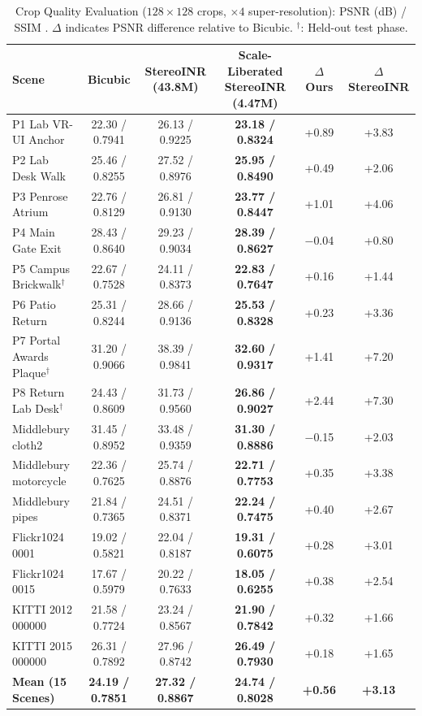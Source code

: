 \documentclass[conference]{IEEEtran}
\newcommand{\ours}{Scale-Liberated StereoINR}
\begin{document}
\begin{table}[!t]
\centering
\caption{Crop Quality Evaluation ($128{\times}128$ crops, $\times 4$ super-resolution): PSNR (dB) / SSIM \cite{ssim}. $\Delta$ indicates PSNR difference relative to Bicubic. $^\dagger$: Held-out test phase.}\label{tab:crop}
\small
\begin{tabular}{@{}lccccc@{}}
\toprule
\textbf{Scene} & \textbf{Bicubic} & \textbf{StereoINR (43.8M)} & \textbf{\ours{} (4.47M)} & \textbf{$\Delta$ Ours} & \textbf{$\Delta$ StereoINR} \\
\midrule
P1 Lab VR-UI Anchor & 22.30 / 0.7941 & 26.13 / 0.9225 & \textbf{23.18 / 0.8324} & +0.89 & +3.83 \\
P2 Lab Desk Walk & 25.46 / 0.8255 & 27.52 / 0.8976 & \textbf{25.95 / 0.8490} & +0.49 & +2.06 \\
P3 Penrose Atrium & 22.76 / 0.8129 & 26.81 / 0.9130 & \textbf{23.77 / 0.8447} & +1.01 & +4.06 \\
P4 Main Gate Exit & 28.43 / 0.8640 & 29.23 / 0.9034 & \textbf{28.39 / 0.8627} & $-$0.04 & +0.80 \\
P5 Campus Brickwalk$^\dagger$ & 22.67 / 0.7528 & 24.11 / 0.8373 & \textbf{22.83 / 0.7647} & +0.16 & +1.44 \\
P6 Patio Return & 25.31 / 0.8244 & 28.66 / 0.9136 & \textbf{25.53 / 0.8328} & +0.23 & +3.36 \\
P7 Portal Awards Plaque$^\dagger$ & 31.20 / 0.9066 & 38.39 / 0.9841 & \textbf{32.60 / 0.9317} & +1.41 & +7.20 \\
P8 Return Lab Desk$^\dagger$ & 24.43 / 0.8609 & 31.73 / 0.9560 & \textbf{26.86 / 0.9027} & +2.44 & +7.30 \\
\midrule
Middlebury cloth2 & 31.45 / 0.8952 & 33.48 / 0.9359 & \textbf{31.30 / 0.8886} & $-$0.15 & +2.03 \\
Middlebury motorcycle & 22.36 / 0.7625 & 25.74 / 0.8876 & \textbf{22.71 / 0.7753} & +0.35 & +3.38 \\
Middlebury pipes & 21.84 / 0.7365 & 24.51 / 0.8371 & \textbf{22.24 / 0.7475} & +0.40 & +2.67 \\
Flickr1024 0001 \cite{flickr1024} & 19.02 / 0.5821 & 22.04 / 0.8187 & \textbf{19.31 / 0.6075} & +0.28 & +3.01 \\
Flickr1024 0015 & 17.67 / 0.5979 & 20.22 / 0.7633 & \textbf{18.05 / 0.6255} & +0.38 & +2.54 \\
KITTI 2012 000000 & 21.58 / 0.7724 & 23.24 / 0.8567 & \textbf{21.90 / 0.7842} & +0.32 & +1.66 \\
KITTI 2015 000000 & 26.31 / 0.7892 & 27.96 / 0.8742 & \textbf{26.49 / 0.7930} & +0.18 & +1.65 \\
\midrule
\textbf{Mean (15 Scenes)} & \textbf{24.19 / 0.7851} & \textbf{27.32 / 0.8867} & \textbf{24.74 / 0.8028} & \textbf{+0.56} & \textbf{+3.13} \\
\bottomrule
\end{tabular}
\end{table}
\end{document}
